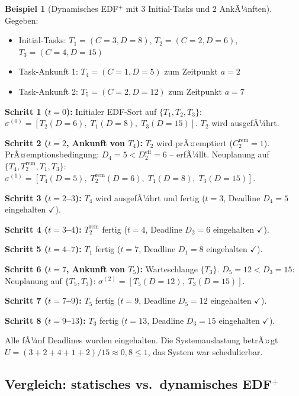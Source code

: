 ﻿\documentclass[a4paper,12pt]{article}
\theoremstyle{definition}
\newtheorem{beispiel}{Beispiel}
\begin{document}
	\begin{beispiel}[Dynamisches EDF$^+$ mit 3 Initial-Tasks und 2 AnkÃ¼nften]
		Gegeben:
		\begin{itemize}
			\item Initial-Tasks: $T_1 = (C=3, D=8)$, $T_2 = (C=2, D=6)$, $T_3 = (C=4, D=15)$
			\item Task-Ankunft 1: $T_4 = (C=1, D=5)$ zum Zeitpunkt $a=2$
			\item Task-Ankunft 2: $T_5 = (C=2, D=12)$ zum Zeitpunkt $a=7$
		\end{itemize}

		\textbf{Schritt 1 ($t=0$):} Initialer EDF-Sort auf $\{T_1, T_2, T_3\}$:
		$\sigma^{(0)} = [T_2(D=6),\; T_1(D=8),\; T_3(D=15)]$.
		$T_2$ wird ausgefÃ¼hrt.

		\textbf{Schritt 2 ($t=2$, Ankunft von $T_4$):} $T_2$ wird prÃ¤emptiert
		($C_2^{\text{rem}} = 1$). PrÃ¤emptionsbe\-dingung: $D_4 = 5 < D_2^{\text{eff}} = 6$
		-- erfÃ¼llt. Neuplanung auf $\{T_4, T_2^{\text{rem}}, T_1, T_3\}$:
		$\sigma^{(1)} = [T_4(D=5),\; T_2^{\text{rem}}(D=6),\; T_1(D=8),\; T_3(D=15)]$.

		\textbf{Schritt 3 ($t=2$--$3$):} $T_4$ wird ausgefÃ¼hrt und fertig ($t=3$,
		Deadline $D_4=5$ eingehalten $\checkmark$).

		\textbf{Schritt 4 ($t=3$--$4$):} $T_2^{\text{rem}}$ fertig ($t=4$,
		Deadline $D_2=6$ eingehalten $\checkmark$).

		\textbf{Schritt 5 ($t=4$--$7$):} $T_1$ fertig ($t=7$, Deadline $D_1=8$ eingehalten $\checkmark$).

		\textbf{Schritt 6 ($t=7$, Ankunft von $T_5$):} Warteschlange $\{T_3\}$.
		$D_5 = 12 < D_3 = 15$: Neuplanung auf $\{T_5, T_3\}$:
		$\sigma^{(2)} = [T_5(D=12),\; T_3(D=15)]$.

		\textbf{Schritt 7 ($t=7$--$9$):} $T_5$ fertig ($t=9$, Deadline $D_5=12$ eingehalten $\checkmark$).

		\textbf{Schritt 8 ($t=9$--$13$):} $T_3$ fertig ($t=13$, Deadline $D_3=15$ eingehalten $\checkmark$).

		Alle fÃ¼nf Deadlines wurden eingehalten. Die Systemauslastung betrÃ¤gt
		$U = (3+2+4+1+2)/15 \approx 0{,}8 \le 1$, das System war schedulierbar.
	\end{beispiel}

	\subsection{Vergleich: statisches vs.\ dynamisches EDF$^+$}
\end{document}
